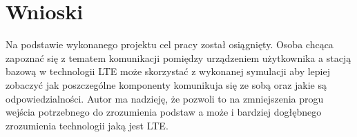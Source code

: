 \section{Wnioski}

Na podstawie wykonanego projektu cel pracy został osiągnięty. Osoba chcąca zapoznać się z tematem komunikacji pomiędzy urządzeniem użytkownika a stacją bazową w technologii LTE może skorzystać z wykonanej symulacji aby lepiej zobaczyć jak poszczególne komponenty komunikuja się ze sobą oraz jakie są odpowiedzialności. Autor ma nadzieję, że pozwoli to na zmniejszenia progu wejścia potrzebnego do zrozumienia podstaw a może i bardziej dogłębnego zrozumienia technologii jaką jest LTE.